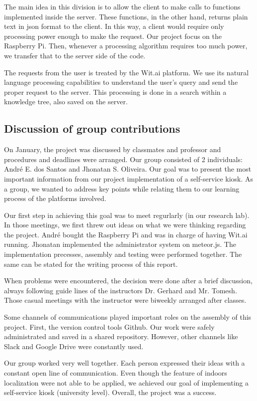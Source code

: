 The main idea in this division is to allow the client to make calls to functions implemented inside the server.
These functions, in the other hand, returns plain text in json format to the client.
In this way, a client would require only processing power enough to make the request.
Our project focus on the Raspberry Pi.
Then, whenever a processing algorithm requires too much power, we transfer that to the server side of the code.

The requests from the user is treated by the Wit.ai platform.
We use its natural language processing capabilities to understand the user's query and send the proper request to the server.
This processing is done in a search within a knowledge tree, also saved on the server.

\subsection{Discussion of group contributions}

On January, the project was discussed by classmates and professor and procedures and deadlines were arranged.
Our group consisted of 2 individuals: André E. dos Santos and Jhonatan S. Oliveira. 
Our goal was to present the most important information from our project implementation of a self-service kiosk.
As a group, we wanted to address key points while relating them to our learning process of the platforms involved.

Our first step in achieving this goal was to meet regurlarly (in our research lab).
In those meetings, we first threw out ideas on what we were thinking regarding the project. 
André bought the Raspberry Pi and was in charge of having Wit.ai running.
Jhonatan implemented the administrator system on meteor.js.
The implementation precesses, assembly and testing were performed together.
The same can be stated for the writing process of this report.


When problems were encountered, the decision were done after a brief discussion, always following guide lines of the instructors Dr. Gerhard and Mr. Tomesh.
Those casual meetings with the instructor were biweekly arranged after classes.


Some channels of communications played important roles on the assembly of this project.
First, the version control tools Github.
Our work were safely administrated and saved in a shared repository.
However, other channels like Slack and  Google Drive were constantly used.


Our group worked very well together. 
Each person expressed their ideas with a constant open line of communication. 
Even though the feature of indoors localization were not able to be applied, we achieved our goal of implementing a self-service kiosk (university level).  
Overall, the project was a success. 



